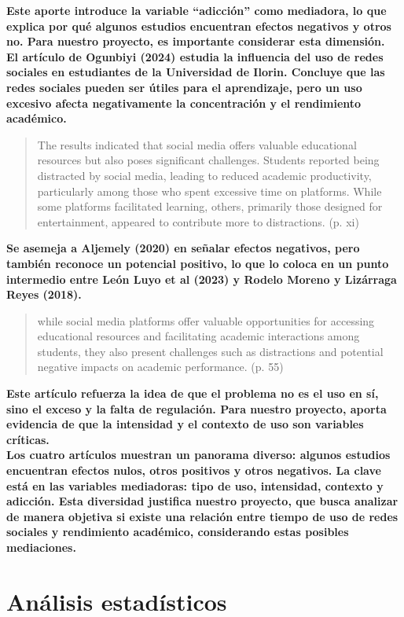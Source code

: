 \documentclass[12pt]{article}
\begin{document}
\textbf{Este aporte introduce la variable “adicción” como mediadora, lo que explica por qué algunos estudios encuentran efectos negativos y otros no. Para nuestro proyecto, es importante considerar esta dimensión.}\\

\textbf{El artículo de Ogunbiyi (2024) estudia la influencia del uso de redes sociales en estudiantes de la Universidad de Ilorin. Concluye que las redes sociales pueden ser útiles para el aprendizaje, pero un uso excesivo afecta negativamente la concentración y el rendimiento académico. }
\begin{quote}
    The results indicated that social media offers valuable educational resources but also poses significant challenges. Students reported being distracted by social media, leading to reduced academic productivity, particularly among those who spent excessive time on platforms. While some platforms facilitated learning, others, primarily those designed for entertainment, appeared to contribute more to distractions. (p. xi)
\end{quote}

\textbf{Se asemeja a Aljemely (2020) en señalar efectos negativos, pero también reconoce un potencial positivo, lo que lo coloca en un punto intermedio entre León Luyo et al (2023) y Rodelo Moreno y Lizárraga Reyes (2018).
}
\begin{quote}
    while social media platforms offer valuable opportunities for accessing educational resources and facilitating academic interactions among students, they also present challenges such as distractions and potential negative impacts on academic performance. (p. 55)
\end{quote}

\textbf{Este artículo refuerza la idea de que el problema no es el uso en sí, sino el exceso y la falta de regulación. Para nuestro proyecto, aporta evidencia de que la intensidad y el contexto de uso son variables críticas.
}\\

\textbf{Los cuatro artículos muestran un panorama diverso: algunos estudios encuentran efectos nulos, otros positivos y otros negativos. La clave está en las variables mediadoras: tipo de uso, intensidad, contexto y adicción. Esta diversidad justifica nuestro proyecto, que busca analizar de manera objetiva si existe una relación entre tiempo de uso de redes sociales y rendimiento académico, considerando estas posibles mediaciones.}

\section{Análisis estadísticos}
\end{document}
